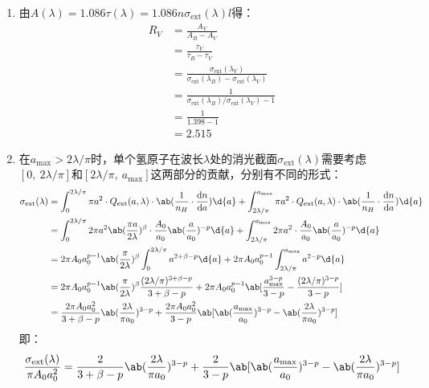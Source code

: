 \documentclass[a4paper,fontset=none]{ctexart}
\begin{document}
\begin{enumerate}
    \medskip
    \item[23.1 (c)]
    由$A(\lambda) = 1.086\tau(\lambda) = 1.086n \sigma_{\mathrm{ext}}(\lambda) l$得：
    \begin{align*}
        R_V
        &= \frac{A_V}{A_B - A_V} \\
        &= \frac{\tau_V}{\tau_B - \tau_V} \\
        &= \frac{\sigma_{\mathrm{ext}}(\lambda_V)}{\sigma_{\mathrm{ext}}(\lambda_B) - \sigma_{\mathrm{ext}}(\lambda_V)} \\
        &= \frac{1}{\sigma_{\mathrm{ext}}(\lambda_B) / \sigma_{\mathrm{ext}}(\lambda_V) - 1} \\
        &= \frac{1}{1.398 - 1} \\
        &= 2.515
    \end{align*}

    \medskip
    \item[23.1 (d)]
    在$a_{\mathrm{max}} > 2\lambda/\pi$时，单个氢原子在波长$\lambda$处的消光截面$\sigma_{\mathrm{ext}}(\lambda)$需要考虑$[0,\ 2\lambda/\pi]$和$[2\lambda/\pi,\ a_{\mathrm{max}}]$这两部分的贡献，分别有不同的形式：
    \begin{align*}
        \sigma_{\mathrm{ext}}(\lambda)
        &= \int_0^{2\lambda/\pi} \pi a^2 \cdot Q_{\mathrm{ext}}(a, \lambda) \cdot \ab(\frac{1}{n_H} \cdot \odv{n}{a}) \d{a} + \int_{2\lambda/\pi}^{a_{\mathrm{max}}} \pi a^2 \cdot Q_{\mathrm{ext}}(a, \lambda) \cdot \ab(\frac{1}{n_H} \cdot \odv{n}{a}) \d{a} \\
        &= \int_0^{2\lambda/\pi} 2\pi a^2 \ab(\frac{\pi a}{2 \lambda})^\beta \cdot \frac{A_0}{a_0} \ab(\frac{a}{a_0})^{-p} \d{a} + \int_{2\lambda/\pi}^{a_{\mathrm{max}}} 2\pi a^2 \cdot \frac{A_0}{a_0} \ab(\frac{a}{a_0})^{-p} \d{a} \\
        &= 2\pi A_0 a_0^{p-1} \ab(\frac{\pi}{2\lambda})^\beta \int_0^{2\lambda/\pi} a^{2 + \beta - p} \d{a} + 2\pi A_0 a_0^{p-1} \int_{2\lambda/\pi}^{a_{\mathrm{max}}} a^{2 - p} \d{a} \\
        &= 2\pi A_0 a_0^{p-1} \ab(\frac{\pi}{2\lambda})^\beta \frac{(2\lambda/\pi)^{3 + \beta - p}}{3 + \beta - p} + 2\pi A_0 a_0^{p-1} \ab[\frac{a_{\mathrm{max}}^{3 - p}}{3 - p} - \frac{(2\lambda/\pi)^{3 - p}}{3 - p}] \\
        &= \frac{2\pi A_0 a_0^2}{3 + \beta - p} \ab(\frac{2\lambda}{\pi a_0})^{3 - p} + \frac{2\pi A_0 a_0^2}{3 - p} \ab[\ab(\frac{a_{\mathrm{max}}}{a_0})^{3 - p} - \ab(\frac{2\lambda}{\pi a_0})^{3 - p}]
    \end{align*}
    即：
    \[
        \frac{\sigma_{\mathrm{ext}}(\lambda)}{\pi A_0 a_0^2} = \frac{2}{3 + \beta - p} \ab(\frac{2\lambda}{\pi a_0})^{3 - p} + \frac{2}{3 - p} \ab[\ab(\frac{a_{\mathrm{max}}}{a_0})^{3 - p} - \ab(\frac{2\lambda}{\pi a_0})^{3 - p}]
    \]


\end{enumerate}
\end{document}
